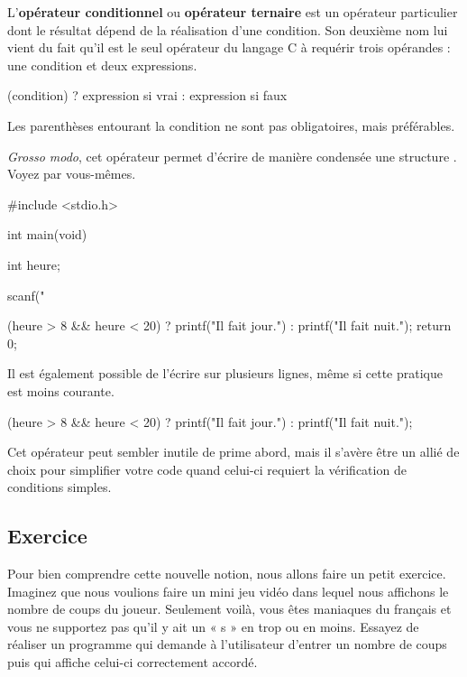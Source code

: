L'\textbf{opérateur conditionnel} ou \textbf{opérateur ternaire} est un opérateur
particulier dont le résultat dépend de la réalisation d'une condition.
Son deuxième nom lui vient du fait qu'il est le seul opérateur du
langage C à requérir trois opérandes : une condition et deux
expressions.

\begin{C}
(condition) ? expression si vrai : expression si faux
\end{C}

\begin{infobox}
Les parenthèses entourant la
condition ne sont pas obligatoires, mais préférables.
\end{infobox}

\emph{Grosso modo}, cet opérateur permet d'écrire de manière condensée
une structure . Voyez par vous-mêmes.

\begin{C}
#include <stdio.h>

int main(void)
{
    int heure;

    scanf("%

    (heure > 8 && heure < 20) ? printf("Il fait jour.\n") : printf("Il fait nuit.\n");
    return 0;
}
\end{C}

Il est également possible de l'écrire sur plusieurs lignes, même si
cette pratique est moins courante.

\begin{C}
(heure > 8 && heure < 20)
    ? printf("Il fait jour.\n")
    : printf("Il fait nuit.\n");
\end{C}

Cet opérateur peut sembler inutile de prime abord, mais il s'avère être
un allié de choix pour simplifier votre code quand celui-ci requiert la
vérification de conditions simples.

\subsection{Exercice}
\label{exercice-2}

Pour bien comprendre cette nouvelle notion, nous allons faire un petit
exercice. Imaginez que nous voulions faire un mini jeu vidéo dans lequel
nous affichons le nombre de coups du joueur. Seulement voilà, vous êtes
maniaques du français et vous ne supportez pas qu'il y ait un « s » en
trop ou en moins. Essayez de réaliser un programme qui demande à
l'utilisateur d'entrer un nombre de coups puis qui affiche celui-ci
correctement accordé.

